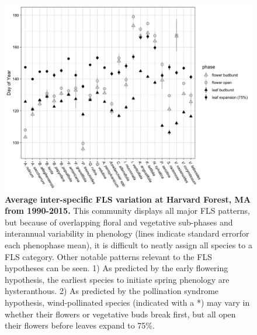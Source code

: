 \documentclass[12pt]{article}
\begin{document}
\begin{figure}[ht]
    \centering
    \includegraphics[width=\textwidth]{..//figure/HFmeans_expanded.png}
    \caption{\textbf{Average inter-specific FLS variation at Harvard Forest, MA from 1990-2015.} This community displays all major FLS patterns, but because of overlapping floral and vegetative sub-phases and interannual variability in phenology (lines indicate standard errorfor each phenophase mean), it is difficult to neatly assign all species to a FLS category. Other notable patterns relevant to the FLS hypotheses can be seen. 1) As predicted by the early flowering hypothesis, the earliest species to initiate spring phenology are hysteranthous. 2) As predicted by the pollination syndrome hypothesis, wind-pollinated species (indicated with a *) may vary in whether their flowers or vegetative buds break first, but all open their flowers before leaves expand to 75\%.}
    \label{fig:Figure 2}
\end{figure}
\end{document}
